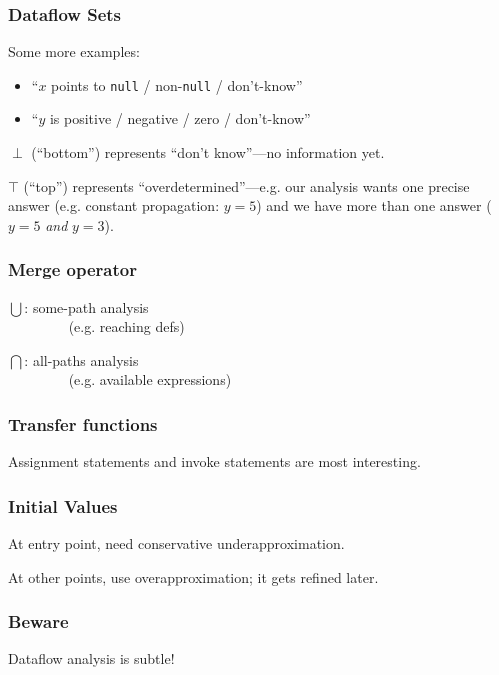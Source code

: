 \documentclass{beamer}
\begin{document}
\begin{frame}
  \frametitle{Dataflow Sets}

Some more examples:
\begin{itemize}
\item ``$x$ points to {\tt null} / non-{\tt null} / don't-know''
\item ``$y$ is positive / negative / zero / don't-know''
\end{itemize}

\vspace*{1em}
$\perp$ (``bottom'') represents ``don't know''---no information yet.

\vspace*{1em}
$\top$ (``top'') represents ``overdetermined''---e.g. our analysis wants one
precise answer (e.g. constant propagation: $y=5$) and we have more than one answer ($y=5$ \emph{and} $y=3$).
\end{frame}

\begin{frame}
  \frametitle{Merge operator}

\Large
$\bigcup$: some-path analysis\\ $\qquad \qquad$ (e.g. reaching defs)

\vspace*{1em}

$\bigcap$: all-paths analysis\\ $\qquad \qquad$ (e.g. available expressions)

\end{frame}

\begin{frame}
  \frametitle{Transfer functions}

\Large

  Assignment statements and invoke statements are most interesting.

\end{frame}

\begin{frame}
  \frametitle{Initial Values}

\Large

At entry point, need conservative underapproximation.

\vspace*{1em}

At other points, use overapproximation; it gets refined later.

\end{frame}

\begin{frame}

  \frametitle{Beware}

\Huge
Dataflow analysis is subtle!

\end{frame}
\end{document}
